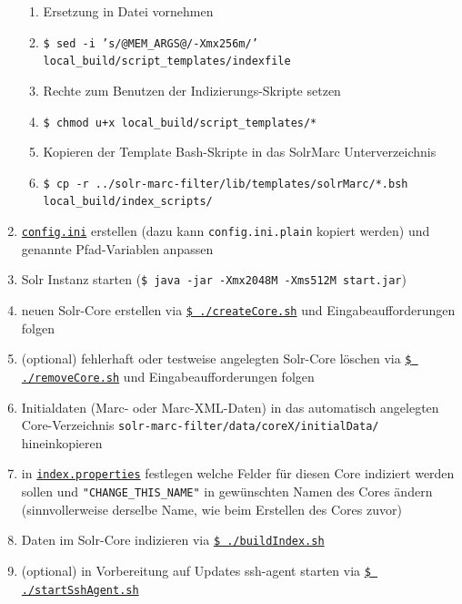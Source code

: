 \documentclass[10pt]{article}
\begin{document}
\begin{enumerate}
\begin{enumerate}
		\item Ersetzung in Datei vornehmen 
		\item[] \texttt{\$ sed -i 's/@MEM\_ARGS@/-Xmx256m/' local\_build/script\_templates/indexfile}
		
		\item Rechte zum Benutzen der Indizierungs-Skripte setzen
		\item[] \texttt{\$ chmod u+x local\_build/script\_templates/*}
		
		\item Kopieren der Template Bash-Skripte in das SolrMarc Unterverzeichnis
		\item[] \texttt{\$ cp -r ../solr-marc-filter/lib/templates/solrMarc/*.bsh local\_build/index\_scripts/}
		
	\end{enumerate}
	\item \hyperref[sec:para:config.ini]{\texttt{config.ini}} erstellen (dazu kann \texttt{config.ini.plain} kopiert werden) und genannte Pfad-Variablen anpassen
	\item Solr Instanz starten (\texttt{\$ java -jar -Xmx2048M -Xms512M start.jar})
	\item neuen Solr-Core erstellen via \hyperref[sec:para:createCore]{\texttt{\$ ./createCore.sh}} und Eingabeaufforderungen folgen
	\item (optional) fehlerhaft oder testweise angelegten Solr-Core löschen via \hyperref[sec:para:removeCore]{\texttt{\$ ./removeCore.sh}} und Eingabeaufforderungen folgen
	\item Initialdaten (Marc- oder Marc-XML-Daten) in das automatisch angelegten Core-Verzeichnis \texttt{solr-marc-filter/data/coreX/initialData/} hineinkopieren
	\item in \hyperref[para:index.properties]{\texttt{index.properties}} festlegen welche Felder für diesen Core indiziert werden sollen und \texttt{"CHANGE\_THIS\_NAME"} in gewünschten Namen des Cores ändern (sinnvollerweise derselbe Name, wie beim Erstellen des Cores zuvor)
	\item Daten im Solr-Core indizieren via \hyperref[sec:para:buildIndex]{\texttt{\$ ./buildIndex.sh}}
	\item (optional) in Vorbereitung auf Updates ssh-agent starten via \hyperref[sec:para:startSshAgent]{\texttt{\$ ./startSshAgent.sh}}

\end{enumerate}
\end{document}

